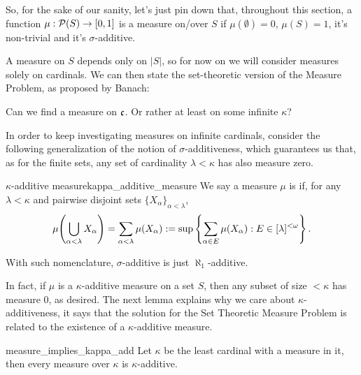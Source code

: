 So, for the sake of our sanity, let's just pin down that, throughout this section, a function $\mu:\mathcal{P}(S)\to[0,1]$ is a measure on/over $S$ if $\mu(\emptyset)=0$, $\mu(S)=1$, it's non-trivial and it's $\sigma$-additive.

A measure on $S$ depends only on $\lvert S\rvert$, so for now on we will consider measures solely on cardinals. We can then state the set-theoretic version of the Measure Problem, as proposed by Banach:

\begin{tcolorbox}[colback=gray!5,colframe=gray!80!black]
\centering
{}

Can we find a measure on $\mathfrak{c}$. Or rather at least on some infinite $\kappa$?
\end{tcolorbox}

In order to keep investigating measures on infinite cardinals, consider the following generalization of the notion of $\sigma$-additiveness, which guarantees us that, as for the finite sets, any set of cardinality $\lambda<\kappa$ has also measure zero.

\begin{definition}{$\kappa$-additive measure}{kappa_additive_measure}
    We say a measure $\mu$ is  if, for any $\lambda<\kappa$ and pairwise disjoint sets $\{X_\alpha\}_{\alpha<\lambda}$,
    $$\mu{\left(\bigcup_{\alpha<\lambda}X_\alpha\right)}=\sum_{\alpha<\lambda}\mu(X_\alpha):=\sup\left\{\sum_{\alpha\in E}\mu(X_\alpha):E\in[\lambda]^{<\omega}\right\}.$$
\end{definition}

With such nomenclature, $\sigma$-additive is just $\aleph_1$-additive.

In fact, if $\mu$ is a $\kappa$-additive measure on a set $S$, then any subset of size $<\kappa$ has measure $0$, as desired. The next lemma explains why we care about $\kappa$-additiveness, it says that the solution for the Set Theoretic Measure Problem is related to the existence of a $\kappa$-additive measure.

\begin{lemma}{}{measure_implies_kappa_add}
    Let $\kappa$ be the least cardinal with a measure in it, then every measure over $\kappa$ is $\kappa$-additive.
\end{lemma}

